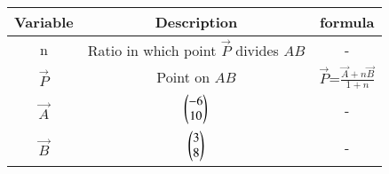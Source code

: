 \begin{tabular}[12pt]{ |c|c|c|}
\hline
\textbf{Variable} & \textbf{Description} & \textbf{formula}\\ 
\hline
n & Ratio in which point $\vec{P}$ divides $AB$ & - \\
\hline 
$\vec{P}$ & Point on $AB$ & $\vec{P}$=$\frac{\vec{A} + n\vec{B}}{1+n}$\\
\hline
$\vec{A}$ & $\begin{pmatrix}-6 \\ 10\end{pmatrix}$ & -\\
\hline
$\vec{B}$ & $\begin{pmatrix}3 \\ 8\end{pmatrix}$ & -\\
\hline   
\end{tabular}
